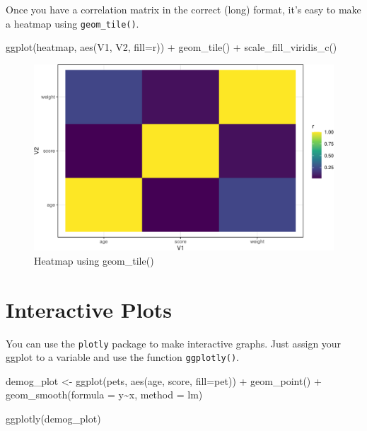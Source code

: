 \documentclass[
  oneside]{book}
\newenvironment{Shaded}{\begin{snugshade}}{\end{snugshade}}
\newcommand{\AttributeTok}[1]{\textcolor[rgb]{0.77,0.63,0.00}{#1}}
\newcommand{\FunctionTok}[1]{\textcolor[rgb]{0.00,0.00,0.00}{#1}}
\newcommand{\NormalTok}[1]{#1}
\newcommand{\OtherTok}[1]{\textcolor[rgb]{0.56,0.35,0.01}{#1}}
\newcommand{\SpecialCharTok}[1]{\textcolor[rgb]{0.00,0.00,0.00}{#1}}
\begin{document}
Once you have a correlation matrix in the correct (long) format, it's easy to make a heatmap using \texttt{geom\_tile()}.

\begin{Shaded}
\begin{Highlighting}[]
\FunctionTok{ggplot}\NormalTok{(heatmap, }\FunctionTok{aes}\NormalTok{(V1, V2, }\AttributeTok{fill=}\NormalTok{r)) }\SpecialCharTok{+}
  \FunctionTok{geom\_tile}\NormalTok{() }\SpecialCharTok{+}
  \FunctionTok{scale\_fill\_viridis\_c}\NormalTok{()}
\end{Highlighting}
\end{Shaded}

\begin{figure}

{\centering \includegraphics[width=0.9\linewidth]{images/heatmap-1} 

}

\caption{Heatmap using geom_tile()}\label{fig:heatmap}
\end{figure}

\hypertarget{plotly}{%
\section{Interactive Plots}\label{plotly}}

You can use the \texttt{plotly} package to make interactive graphs. Just assign your ggplot to a variable and use the function \texttt{ggplotly()}.

\begin{Shaded}
\begin{Highlighting}[]
\NormalTok{demog\_plot }\OtherTok{\textless{}{-}} \FunctionTok{ggplot}\NormalTok{(pets, }\FunctionTok{aes}\NormalTok{(age, score, }\AttributeTok{fill=}\NormalTok{pet)) }\SpecialCharTok{+}
  \FunctionTok{geom\_point}\NormalTok{() }\SpecialCharTok{+}
  \FunctionTok{geom\_smooth}\NormalTok{(}\AttributeTok{formula =}\NormalTok{ y}\SpecialCharTok{\textasciitilde{}}\NormalTok{x, }\AttributeTok{method =}\NormalTok{ lm)}

\FunctionTok{ggplotly}\NormalTok{(demog\_plot)}
\end{Highlighting}
\end{Shaded}
\end{document}
